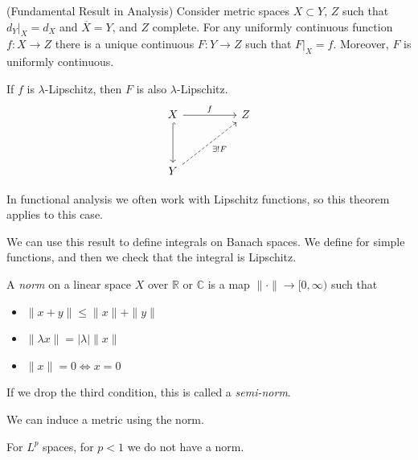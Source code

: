 \begin{theorem}(Fundamental Result in Analysis)
	\label{thm:FundamentalResult}
	Consider metric spaces $X \subset Y$, $Z$ such that $d_Y|_X = d_X$ and $\overline{X}  = Y$, and $Z$ complete. For any uniformly continuous function $f: X \to Z$ there is a unique continuous $F: Y \to Z$ such that $F|_X = f$. Moreover, $F$ is uniformly continuous.

	If $f$ is $\lambda$-Lipschitz, then $F$ is also $\lambda$-Lipschitz.
\[\begin{tikzcd}
	X && Z \\
	\\
	Y
	\arrow["f", from=1-1, to=1-3]
	\arrow[hook, from=1-1, to=3-1]
	\arrow["{\exists ! F}"', dashed, from=3-1, to=1-3]
\end{tikzcd}\]
\end{theorem}

\begin{remark}
	In functional analysis we often work with Lipschitz functions, so this theorem applies to this case.
\end{remark}

\begin{remark}
	We can use this result to define integrals on Banach spaces. We define for simple functions, and then we check that the integral is Lipschitz.
\end{remark}

\begin{definition}
	\label{defn:NormedLinearSpace}
	A \textit{norm} on a linear space $X$ over $\mathbb{R}$ or $\mathbb{C}$ is a map $\|\cdot \| \to  [0,\infty )$ such that
	\begin{itemize}
		\item $\|x + y \|\le  \|x \| + \|y\|$
		\item $\|\lambda x\| = |\lambda| \|x\|$
		\item $\|x\| = 0 \iff  x = 0$
	\end{itemize}
	If we drop the third condition, this is called a \textit{semi-norm}.
\end{definition}

We can induce a metric using the norm.

For $L^p$ spaces, for $p < 1$ we do not have a norm.
